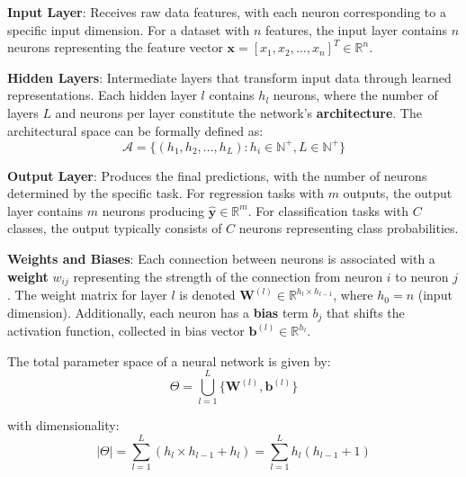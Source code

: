 \documentclass[11pt,a4paper]{report}
\begin{document}
\textbf{Input Layer}: Receives raw data features, with each neuron corresponding to a specific input dimension. For a dataset with $n$ features, the input layer contains $n$ neurons representing the feature vector $\mathbf{x} = [x_1, x_2, \ldots, x_n]^T \in \mathbb{R}^n$.

\textbf{Hidden Layers}: Intermediate layers that transform input data through learned representations. Each hidden layer $l$ contains $h_l$ neurons, where the number of layers $L$ and neurons per layer constitute the network's \textbf{architecture}. The architectural space can be formally defined as:
\begin{equation}
\mathcal{A} = \{(h_1, h_2, \ldots, h_L) : h_i \in \mathbb{N}^+, L \in \mathbb{N}^+\}
\end{equation}

\textbf{Output Layer}: Produces the final predictions, with the number of neurons determined by the specific task. For regression tasks with $m$ outputs, the output layer contains $m$ neurons producing $\hat{\mathbf{y}} \in \mathbb{R}^m$. For classification tasks with $C$ classes, the output typically consists of $C$ neurons representing class probabilities.

\textbf{Weights and Biases}: Each connection between neurons is associated with a \textbf{weight} $w_{ij}$ representing the strength of the connection from neuron $i$ to neuron $j$. The weight matrix for layer $l$ is denoted $\mathbf{W}^{(l)} \in \mathbb{R}^{h_l \times h_{l-1}}$, where $h_0 = n$ (input dimension). Additionally, each neuron has a \textbf{bias} term $b_j$ that shifts the activation function, collected in bias vector $\mathbf{b}^{(l)} \in \mathbb{R}^{h_l}$.

The total parameter space of a neural network is given by:
\begin{equation}
\Theta = \bigcup_{l=1}^{L} \{\mathbf{W}^{(l)}, \mathbf{b}^{(l)}\}
\end{equation}

with dimensionality:
\begin{equation}
|\Theta| = \sum_{l=1}^{L} (h_l \times h_{l-1} + h_l) = \sum_{l=1}^{L} h_l(h_{l-1} + 1)
\end{equation}
\end{document}
